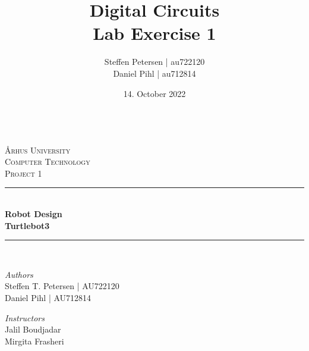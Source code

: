 \documentclass{article}
\title{\Huge Digital Circuits\\\LARGE Lab Exercise 1} %
\author{Steffen Petersen | au722120 \\ Daniel Pihl | au712814} %
\date{14. October 2022} %
\begin{document}

\begin{titlepage} %
  \newcommand{\HRule}{\rule{\linewidth}{0.5mm}} %

    \center %
    
    \textbf{\space}\\[2cm]   
    \textsc{\LARGE Århus University}\\[1.5cm] %
    
    \textsc{\Large Computer Technology}\\[0.5cm] %
    
    \textsc{\large Project 1}\\[0.5cm] %
    
    
    \HRule\\[0cm]
    
    {\huge\bfseries Robot Design\\[0.1cm]}
    {\large\bfseries Turtlebot3\\}
    
    \HRule\\[1.5cm]
    
    
    \begin{minipage}{0.4\textwidth}
      \begin{flushleft}
        \large
        \textit{Authors}\\
        Steffen T. Petersen | AU722120\\
        Daniel Pihl | AU712814
      \end{flushleft}
    \end{minipage}
    \begin{minipage}{0.4\textwidth}
      \begin{flushright}
        \large\vspace{-4mm}
        \textit{Instructors}\\
        Jalil Boudjadar\\
        Mirgita Frasheri
      \end{flushright}
    \end{minipage}
    

\end{titlepage}
\end{document}
